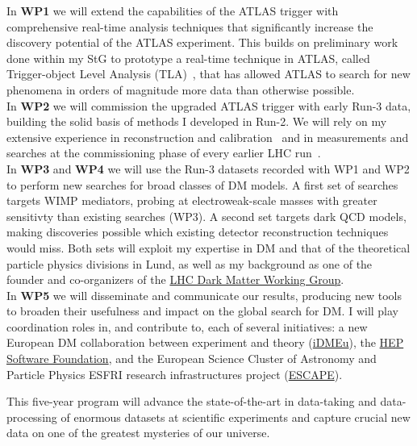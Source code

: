In \textbf{WP1} we will extend the capabilities of the ATLAS trigger with comprehensive real-time analysis techniques that significantly increase the discovery potential of the ATLAS experiment. This builds on preliminary work done within my StG to prototype a real-time technique in ATLAS, called Trigger-object Level Analysis (TLA)~\cite{Aaboud:2018fzt}, that has allowed ATLAS to search for new phenomena in orders of magnitude more data than otherwise possible. \\
In \textbf{WP2} we will commission the upgraded ATLAS trigger with early Run-3 data, building the solid basis of methods I developed in Run-2. We will rely on my extensive experience in reconstruction and calibration~\cite{Aad:2014bia,Aaboud:2018kfi} and in measurements and searches at the commissioning phase of every earlier LHC run~\cite{Doglioni:2011ema,Aad:2014aqa,ATLAS:2015nsi}. \\ %
In \textbf{WP3} and \textbf{WP4} we will use the Run-3 datasets recorded with WP1 and WP2 to perform new searches for broad classes of DM models. A first set of searches targets WIMP mediators, probing at electroweak-scale masses with greater sensitivty than existing searches (WP3). A second set targets dark QCD models, making discoveries possible which existing detector reconstruction techniques would miss. Both sets will exploit my expertise in DM and that of the theoretical particle physics divisions in Lund, as well as my background as one of the founder and co-organizers of the \href{https://lpcc.web.cern.ch/content/lhc-dm-wg-wg-dark-matter-searches-lhc}{LHC Dark Matter Working Group}. \\
In \textbf{WP5} we will disseminate and communicate our results, producing new tools to broaden their usefulness and impact on the global search for DM. I will play coordination roles in, and contribute to, each of several initiatives: a new European DM collaboration between experiment and theory (\href{https://indico.cern.ch/e/idmeu}{iDMEu}), the \href{https://hepsoftwarefoundation.org}{HEP Software Foundation}, and the European Science Cluster of Astronomy and Particle Physics ESFRI research infrastructures project (\href{https://projectescape.eu}{ESCAPE}). 

This five-year program will advance the state-of-the-art in data-taking and data-processing of enormous datasets at scientific experiments and capture crucial new data on one of the greatest mysteries of our universe. 
